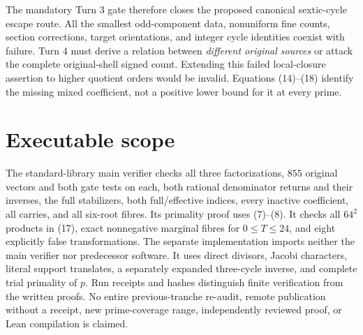 The mandatory Turn 3 gate therefore closes the proposed canonical sextic-cycle
escape route. All the smallest odd-component data, nonuniform fine counts,
section corrections, target orientations, and integer cycle identities coexist
with failure. Turn 4 must derive a relation between \emph{different original
sources} or attack the complete original-shell signed count. Extending this
failed local-closure assertion to higher quotient orders would be invalid.
Equations (14)--(18) identify the missing mixed coefficient, not a positive
lower bound for it at every prime.

\section{Executable scope}
The standard-library main verifier checks all three factorizations, $855$
original vectors and both gate tests on each, both rational denominator returns
and their inverses, the full stabilizers, both full/effective indices, every
inactive coefficient, all carries, and all six-root fibres. Its primality proof
uses (7)--(8). It checks all $64^2$ products in (17), exact nonnegative marginal
fibres for $0\le T\le24$, and eight explicitly false transformations.
The separate implementation imports neither the main verifier nor predecessor
software. It uses direct divisors, Jacobi characters, literal support translates,
a separately expanded three-cycle inverse, and complete trial primality of $p$.
Run receipts and hashes distinguish finite verification from the written proofs.
No entire previous-tranche re-audit, remote publication without a receipt, new
prime-coverage range, independently reviewed proof, or Lean compilation is claimed.

